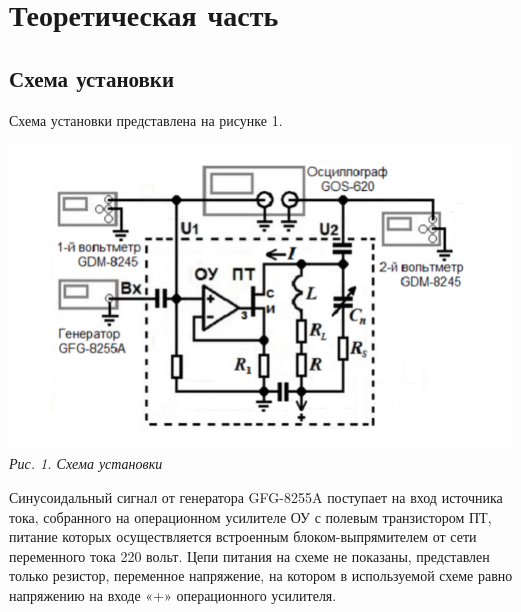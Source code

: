 

\newcommand{\formula}[3]
{
    \noindent#1\\[0.1cm]
    \begin{equation}\label{#2}
        #3
    \end{equation}
}

\newcommand{\mth}[1]
{
    \begin{math}
        #1
    \end{math}
}

\newcommand{\ruB}[1]
{
    _{\text{#1}}
}

\section{Теоретическая часть}
\subsection{Схема установки}

Схема установки представлена на рисунке 1.

\begin{center}

    \includegraphics[scale=0.9]{picks/323-scheme.png} \\
    \textit{Рис. 1. Схема установки}

\end{center}

Синусоидальный сигнал от генератора GFG-8255A поступает на вход источника тока, собранного на операционном усилителе ОУ с полевым транзистором ПТ, питание которых осуществляется встроенным блоком-выпрямителем от сети переменного тока 220 вольт. Цепи питания на схеме не показаны, представлен только резистор, переменное напряжение, на котором в используемой схеме равно напряжению на входе «+» операционного усилителя.

